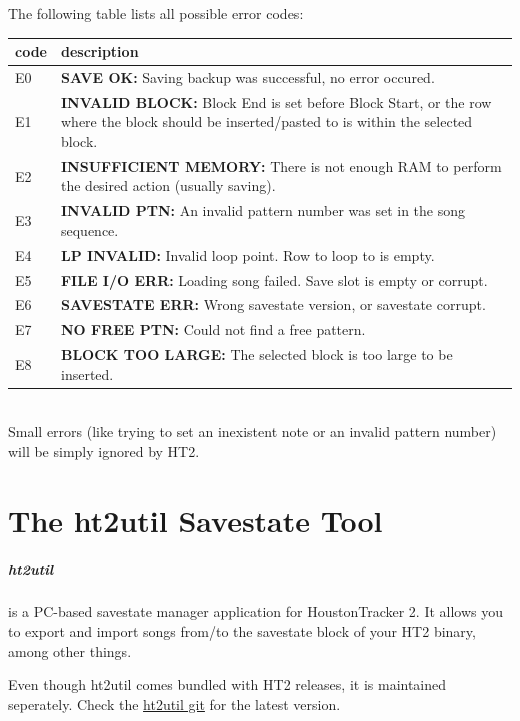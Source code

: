 \documentclass[12pt]{report}	%
\begin{document}
The following table lists all possible error codes: \newline

\begin{tabularx}{\textwidth}{p{} X}
\textbf{code} & \textbf{description} \\
\hline
E0 & \textbf{SAVE OK:} Saving backup was successful, no error occured. \\
E1 & \textbf{INVALID BLOCK:} Block End is set before Block Start, or the row where the block should be inserted/pasted to is within the selected block. \\
E2 & \textbf{INSUFFICIENT MEMORY:} There is not enough RAM to perform the desired action (usually saving). \\
E3 & \textbf{INVALID PTN:} An invalid pattern number was set in the song sequence. \\
E4 & \textbf{LP INVALID:} Invalid loop point. Row to loop to is empty. \\
E5 & \textbf{FILE I/O ERR:} Loading song failed. Save slot is empty or corrupt. \\
E6 & \textbf{SAVESTATE ERR:} Wrong savestate version, or savestate corrupt. \\
E7 & \textbf{NO FREE PTN:} Could not find a free pattern. \\
E8 & \textbf{BLOCK TOO LARGE:} The selected block is too large to be inserted. \\
\end{tabularx} ~\\


Small errors (like trying to set an inexistent note or an invalid pattern number) will be simply ignored by HT2.

\chapter{The ht2util Savestate Tool}
\label{sec:ht2util}
\paragraph{ht2util} is a PC-based savestate manager application for HoustonTracker 2. It allows you to export and import songs from/to the savestate block of your HT2 binary, among other things.

Even though ht2util comes bundled with HT2 releases, it is maintained seperately. Check the \href{https://github.com/utz82/ht2util/releases}{ht2util git} for the latest version.
\end{document}
